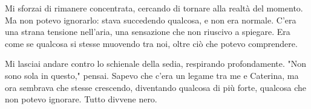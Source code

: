Mi sforzai di rimanere concentrata, cercando di tornare alla realtà del momento. Ma non potevo ignorarlo: stava succedendo qualcosa, e non era normale. C’era una strana tensione nell’aria, una sensazione che non riuscivo a spiegare. Era come se qualcosa si stesse muovendo tra noi, oltre ciò che potevo comprendere.

Mi lasciai andare contro lo schienale della sedia, respirando profondamente. "Non sono sola in questo," pensai. Sapevo che c’era un legame tra me e Caterina, ma ora sembrava che stesse crescendo, diventando qualcosa di più forte, qualcosa che non potevo ignorare. Tutto divvene nero.



